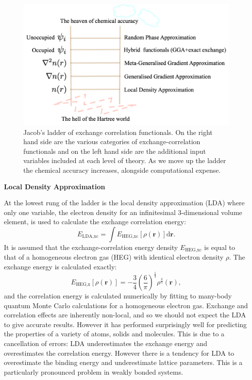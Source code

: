 \begin{figure}[h]
\centering
  \includegraphics[width=0.8\columnwidth]{figures/ch3/jladder.png}
  \caption[Jacob's ladder of exchange-correlation functionals]{Jacob's ladder of exchange correlation functionals. On the right hand side are the various categories of exchange-correlation functionals and on the left hand side are the additional input variables included at each level of theory. As we move up the ladder the chemical accuracy increases, alongside computational expense.}
  \label{jladder}
\end{figure}


\textbf{Local Density Approximation} 

At the lowest rung of the ladder is the local density approximation (LDA) where only one variable, the electron density for an infinitesimal 3-dimensional volume element, is used to calculate the exchange correlation energy:\autocite{Henderson2008}
\begin{equation}
E_{\textrm{LDA,xc}} = \int E_{\textrm{HEG,xc}}\left[\rho\left(\textbf{r}\right)\right]\textrm{d}\mathbf{r} .
\end{equation}
It is assumed that the exchange-correlation energy density $E_{\textrm{HEG,xc}}$ is equal to that of a homogeneous electron gas (HEG) with identical electron density $\rho$. The exchange energy is calculated exactly:\autocite{Henderson2008}
\begin{equation}
E_{\textrm{HEG,x}}\left[\rho\left(\textbf{r}\right)\right] = -\frac{3}{4}\left(\frac{6}{\pi}\right)^{\frac{1}{3}} \rho^{\frac{4}{3}}\left(\textbf{r}\right),
\end{equation}
and the correlation energy is calculated numerically by fitting to many-body quantum Monte Carlo calculations for a homogeneous electron gas.\autocite{Ceperley1980} %
Exchange and correlation effects are inherently non-local, and so we should not expect the LDA to give accurate results.  
However it has performed surprisingly well for predicting the properties of a variety of atoms, solids and molecules. This is due to a cancellation of errors: LDA underestimates the exchange energy and overestimates the correlation energy.\autocite{Burke2007} However there is a tendency for LDA to overestimate the binding energy and underestimate lattice parameters. This is a particularly pronounced problem in weakly bonded systems.

